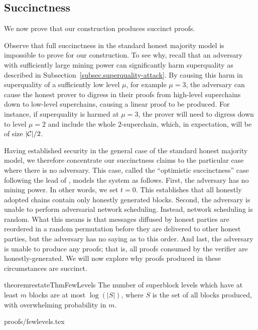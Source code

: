 \subsection{Succinctness}
\label{sec.succinctness}

We now prove that our construction produces succinct proofs.

Observe that full succinctness in the standard honest majority model is
impossible to prove for our construction. To see why, recall that an adversary
with sufficiently large mining power can significantly harm superquality as
described in Subsection~\ref{subsec.superquality-attack}. By causing this harm
in superquality of a sufficiently low level $\mu$, for example $\mu = 3$, the
adversary can cause the honest prover to digress in their proofs from high-level
superchains down to low-level superchains, causing a linear proof to be
produced. For instance, if superquality is harmed at $\mu = 3$, the prover will
need to digress down to level $\mu = 2$ and include the whole $2$-superchain,
which, in expectation, will be of size $|\mathcal{C}|/2$.

Having established security in the general case of the standard honest majority
model, we therefore concentrate our succinctness claims to the particular case
where there is no adversary. This case, called the ``optimistic succinctness''
case following the lead of \cite{KLS}, models the system as follows. First, the
adversary has no mining power. In other words, we set $t = 0$. This establishes
that all honestly adopted chains contain only honestly generated blocks. Second,
the adversary is unable to perform adversarial network scheduling. Instead,
network scheduling is random. What this means is that messages diffused by
honest parties are reordered in a random permutation before they are delivered
to other honest parties, but the adversary has no saying as to this order. And
last, the adversary is unable to produce any proofs; that is, all proofs
consumed by the verifier are honestly-generated. We will now explore why proofs
produced in these circumstances are succinct.

\begin{restatable}{theorem}{restateThmFewLevels}
    \label{thm.few-levels}
    The number of superblock levels which have at least $m$ blocks are at most
    $\log(|S|)$, where $S$ is the set of all blocks produced, with overwhelming
    probability in $m$.
\end{restatable}

\ifonecolumn
{proofs/fewlevels.tex}
\fi

